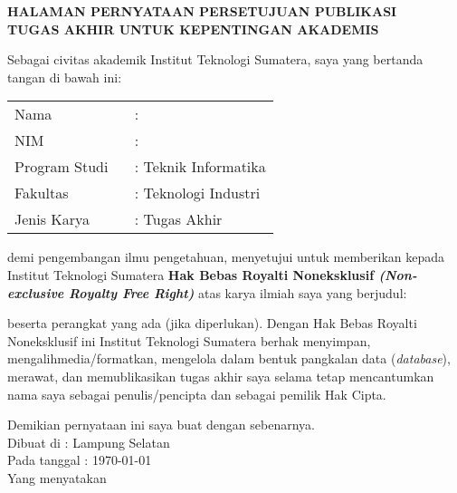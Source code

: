 \clearpage
{}%

\begin{center}
	\smallskip
	
	\normalsize \bfseries \MakeUppercase{
		HALAMAN PERNYATAAN PERSETUJUAN PUBLIKASI \\
		TUGAS AKHIR UNTUK KEPENTINGAN AKADEMIS
	}\linebreak
	
	\normalsize \normalfont \onehalfspacing \justifying
	Sebagai civitas akademik Institut Teknologi Sumatera, saya yang bertanda tangan di bawah ini:
	
	\flushleft
	\setlength{\tabcolsep}{0pt}
	\begin{tabular}{l l}
		Nama 			&  : \theauthor\\
		NIM 			&  : \printnim\\
		Program Studi \	&  : Teknik Informatika\\
		Fakultas 		&  : Teknologi Industri\\
		Jenis Karya 	&  : Tugas Akhir\\
	\end{tabular}

	\justifying
	\noindent demi pengembangan ilmu pengetahuan, menyetujui untuk memberikan kepada Institut Teknologi Sumatera \textbf{Hak Bebas Royalti Noneksklusif \textit{(Non-exclusive Royalty Free Right)}} atas karya ilmiah saya yang berjudul:
	
	\centering
	\textbf{\thetitle}
	
	\justifying
	beserta perangkat yang ada (jika diperlukan). Dengan Hak Bebas Royalti Noneksklusif ini Institut Teknologi Sumatera berhak menyimpan, mengalihmedia/formatkan, mengelola dalam bentuk pangkalan data (\textit{database}), merawat, dan memublikasikan tugas akhir saya selama tetap mencantumkan nama saya sebagai penulis/pencipta dan sebagai pemilik Hak Cipta.
	
	Demikian pernyataan ini saya buat dengan sebenarnya. \\
	
	\centering
	Dibuat di : Lampung Selatan\\
	Pada tanggal : \today\\ %
	\bigskip
	Yang menyatakan\\
	\vspace{2cm}
	\theauthor
	
\end{center}
\clearpage
